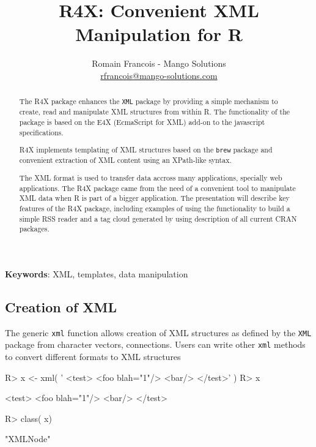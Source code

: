 \documentclass[a4paper,10pt]{article}
\title{R4X: Convenient XML Manipulation for R}
\author{Romain Francois - Mango Solutions \\
\url{rfrancois@mango-solutions.com}}
\begin{document}
\maketitle

\begin{abstract}
The R4X package enhances the \texttt{XML} package by 
providing a simple mechanism to create, read and manipulate XML structures 
from within R. The functionality of the package is based on the E4X (EcmaScript for XML)
add-on to the javascript specifications. 

R4X implements templating of XML structures based on the \texttt{brew} package
and convenient extraction of XML content using an XPath-like syntax. 

The XML format is used to transfer data accross many applications, specially web applications. The R4X 
package came from the need of a convenient tool to manipulate XML data when R is part of a bigger application. 
The presentation will describe key features of the R4X package, including examples of using
the functionality to build a simple RSS reader and a tag cloud generated by using description 
of all current CRAN packages.

\end{abstract}

\textbf{Keywords}: XML, templates, data manipulation

\subsection*{Creation of XML}

The generic \texttt{xml} function allows creation of XML structures as defined by the \texttt{XML} package
from character vectors, connections. Users can write other \texttt{xml} methods to convert 
different formats to XML structures

\begin{Schunk}
\begin{Sinput}
R> x <- xml( '
     <test>
        <foo blah="1"/>
        <bar/>
     </test>' ) 
R> x
\end{Sinput}
\begin{Soutput}
<test>
 <foo blah="1"/>
 <bar/>
</test>
\end{Soutput}
\begin{Sinput}
R> class( x) 
\end{Sinput}
\begin{Soutput}
[1] "XMLNode"
\end{Soutput}
\end{Schunk}
\end{document}
